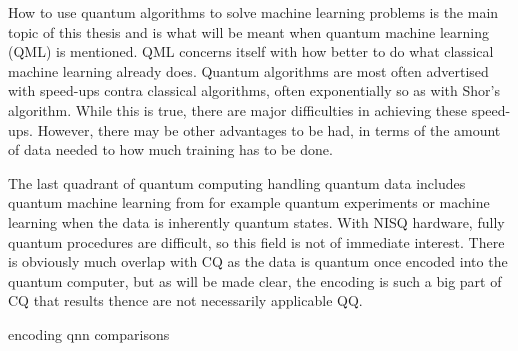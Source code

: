 How to use quantum algorithms to solve machine learning problems is the main topic of this thesis and is what will be meant when quantum machine learning (QML) is mentioned.
QML concerns itself with how better to do what classical machine learning already does.
Quantum algorithms are most often advertised with speed-ups contra classical algorithms, often exponentially so as with Shor's algorithm.
While this is true, there are major difficulties in achieving these speed-ups.
However, there may be other advantages to be had, in terms of the amount of data needed to how much training has to be done.

The last quadrant of quantum computing handling quantum data includes quantum machine learning from for example quantum experiments or machine learning when the data is inherently quantum states.
With NISQ hardware, fully quantum procedures are difficult, so this field is not of immediate interest.
There is obviously much overlap with CQ as the data is quantum once encoded into the quantum computer, but as will be made clear, the encoding is such a big part of CQ that results thence are not necessarily applicable QQ.


{encoding}
{qnn}
{comparisons}